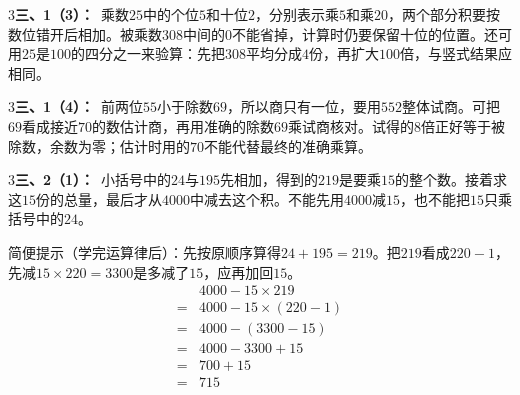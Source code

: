 \documentclass[multi=snippet,border={5bp 20bp 5bp 5bp}]{standalone}
\newenvironment{snippet}[3]{\begin{minipage}{#1bp}\color{answerred}\fontsize{#2}{#3}\selectfont\raggedright}{\end{minipage}}
\begin{document}
\begin{snippet}{505}{11.5}{14}\begin{multicols}{3}\raggedcolumns \textbf{三、1（3）：}\ 乘数\(25\)\allowbreak 中的个位\(5\)\allowbreak 和十位\(2\)\allowbreak ，分别表示乘\(5\)\allowbreak 和乘\(20\)\allowbreak ，两个部分积要按数位错开后相加。被乘数\(308\)\allowbreak 中间的\(0\)\allowbreak 不能省掉，计算时仍要保留十位的位置。还可用\(25\)\allowbreak 是\(100\)\allowbreak 的四分之一来验算：先把\(308\)\allowbreak 平均分成\(4\)\allowbreak 份，再扩大\(100\)\allowbreak 倍，与竖式结果应相同。\end{multicols}\end{snippet}
\begin{snippet}{505}{11.5}{14}\begin{multicols}{3}\raggedcolumns \textbf{三、1（4）：}\ 前两位\(55\)\allowbreak 小于除数\(69\)\allowbreak ，所以商只有一位，要用\(552\)\allowbreak 整体试商。可把\(69\)\allowbreak 看成接近\(70\)\allowbreak 的数估计商，再用准确的除数\(69\)\allowbreak 乘试商核对。试得的\(8\)\allowbreak 倍正好等于被除数，余数为零；估计时用的\(70\)\allowbreak 不能代替最终的准确乘算。\end{multicols}\end{snippet}
\begin{snippet}{505}{11.5}{14}\begin{multicols}{3}\raggedcolumns \textbf{三、2（1）：}\ 小括号中的\(24\)\allowbreak 与\(195\)\allowbreak 先相加，得到的\(219\)\allowbreak 是要乘\(15\)\allowbreak 的整个数。接着求这\(15\)\allowbreak 份的总量，最后才从\(4000\)\allowbreak 中减去这个积。不能先用\(4000\)\allowbreak 减\(15\)\allowbreak ，也不能把\(15\)\allowbreak 只乘括号中的\(24\)\allowbreak 。\par 简便提示（学完运算律后）：先按原顺序算得\(24+195=219\)\allowbreak 。把\(219\)\allowbreak 看成\(220-1\)\allowbreak ，先减\(15\times220=3300\)\allowbreak 是多减了\(15\)\allowbreak ，应再加回\(15\)\allowbreak 。\[\begin{aligned}&4000-15\times219\\={}&4000-15\times(220-1)\\={}&4000-(3300-15)\\={}&4000-3300+15\\={}&700+15\\={}&715\end{aligned}\]\end{multicols}\end{snippet}
\end{document}
